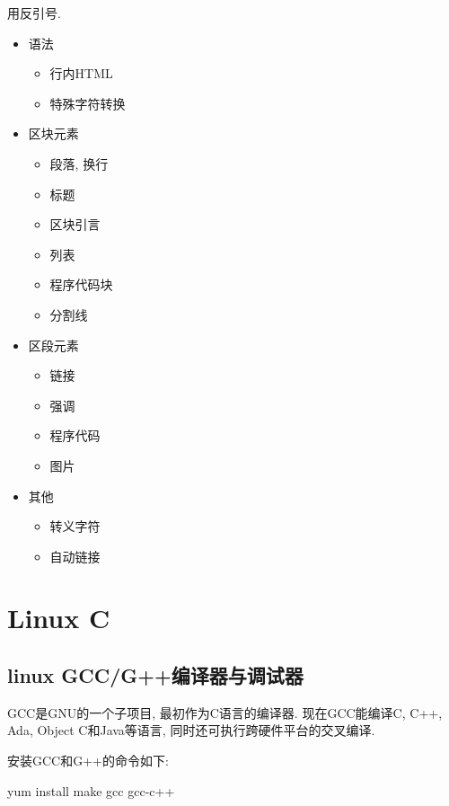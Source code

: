 用反引号.
\begin{itemize}
 \item 语法
 \begin{itemize}
  \item 行内HTML
  \item 特殊字符转换
 \end{itemize}
  \item 区块元素
  \begin{itemize}
   \item 段落, 换行
   \item 标题
   \item 区块引言
   \item 列表
   \item 程序代码块
   \item 分割线
  \end{itemize}
  \item 区段元素
  \begin{itemize}
   \item 链接
   \item 强调
   \item 程序代码
   \item 图片
  \end{itemize}
  \item 其他
  \begin{itemize}
   \item 转义字符
   \item 自动链接
  \end{itemize}
\end{itemize}

\section{Linux C}


\subsection{linux GCC/G++编译器与调试器}
GCC是GNU的一个子项目, 最初作为C语言的编译器. 现在GCC能编译C, 
C++, Ada, Object C和Java等语言, 同时还可执行跨硬件平台的交叉编译.

安装GCC和G++的命令如下:
\begin{shell}
 yum install make gcc gcc-c++
\end{shell}

